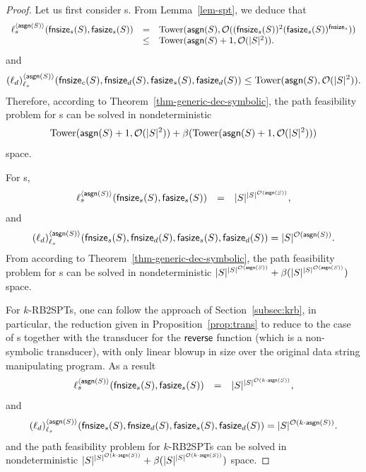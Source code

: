 \begin{proof}
Let us first consider \SSPT{}s. From Lemma~\ref{lem-spt}, we deduce that 
$$
\begin{array}{l c l}
\ell_s^{\langle \mathsf{asgn}(S) \rangle}(\mathsf{fnsize}_s(S), \mathsf{fasize}_s(S)) &=& \mathrm{Tower}(\mathsf{asgn}(S), \mathcal{O}((\mathsf{fnsize}_s(S))^2 (\mathsf{fasize}_s(S))^{\mathsf{fnsize}_s})) \\
& \le &  \mathrm{Tower}(\mathsf{asgn}(S)+1, \mathcal{O}(|S|^2)).
\end{array}
$$
and
$$
(\ell_d)^{\langle \mathsf{asgn}(S) \rangle}_{\ell_s}(\mathsf{fnsize}_c(S), \mathsf{fnsize}_d(S), \mathsf{fasize}_s(S), \mathsf{fasize}_d(S)) \\
\le  \mathrm{Tower}(\mathsf{asgn}(S), \mathcal{O}(|S|^2)).
$$
Therefore, according to Theorem~\ref{thm-generic-dec-symbolic},  the path feasibility problem for \SSPT{}s can be solved in nondeterministic 
$$\mathrm{Tower}(\mathsf{asgn}(S)+1, \mathcal{O}(|S|^2)) + \beta(\mathrm{Tower}(\mathsf{asgn}(S)+1, \mathcal{O}(|S|^2)))$$
 space.
 
 For \SPT{}s, 
 $$
\begin{array}{l c l}
\ell_s^{\langle \mathsf{asgn}(S) \rangle}(\mathsf{fnsize}_s(S), \mathsf{fasize}_s(S)) &=& |S|^{|S|^{\mathcal{O}(\mathsf{asgn}(S))}},
\end{array}
$$
and
$$
(\ell_d)^{\langle \mathsf{asgn}(S) \rangle}_{\ell_s}(\mathsf{fnsize}_s(S), \mathsf{fnsize}_d(S), \mathsf{fasize}_s(S), \mathsf{fasize}_d(S)) = |S|^{\mathcal{O}(\mathsf{asgn}(S))}.
$$
From according to Theorem~\ref{thm-generic-dec-symbolic}, the path feasibility problem for \SPT{}s can be solved in nondeterministic 
$|S|^{|S|^{\mathcal{O}(\mathsf{asgn}(S))}} + \beta(|S|^{|S|^{\mathcal{O}(\mathsf{asgn}(S))}})$
space.

 For $k$-RB2SPTs, one can follow the approach of Section~\ref{subsec:krb}, in particular, the reduction given in Proposition~\ref{prop:trans} to reduce to the case of  \SPT{}s together with the transducer for the ${\sf reverse}$ function (which is a non-symbolic transducer), with only linear blowup in size over the original data string manipulating program. As a result  
$$
\begin{array}{l c l}
\ell_s^{\langle \mathsf{asgn}(S) \rangle}(\mathsf{fnsize}_s(S), \mathsf{fasize}_s(S)) &=& |S|^{|S|^{\mathcal{O}(k\cdot \mathsf{asgn}(S))}},
\end{array}
$$
and
$$
(\ell_d)^{\langle \mathsf{asgn}(S) \rangle}_{\ell_s}(\mathsf{fnsize}_s(S), \mathsf{fnsize}_d(S), \mathsf{fasize}_s(S), \mathsf{fasize}_d(S)) = |S|^{\mathcal{O}(k\cdot \mathsf{asgn}(S))}.
$$
and the path feasibility problem for  $k$-RB2SPTs can be solved in nondeterministic 
$|S|^{|S|^{\mathcal{O}(k\cdot \mathsf{asgn}(S))}} + \beta(|S|^{|S|^{\mathcal{O}(k\cdot \mathsf{asgn}(S))}})$
space.
\end{proof}
